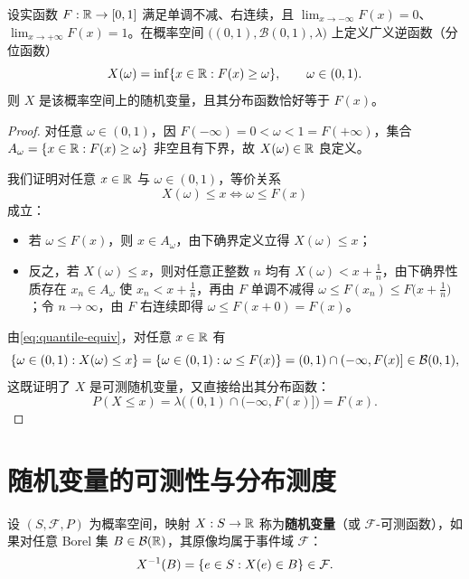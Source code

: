 \begin{theorem}
\label{thm:cdf-sufficiency}
设实函数 $F:\mathbb{R}\to[0,1]$ 满足单调不减、右连续，且 $\lim_{x\to-\infty}F(x)=0$、$\lim_{x\to+\infty}F(x)=1$。在概率空间 $\bigl((0,1),\mathcal{B}(0,1),\lambda\bigr)$ 上定义广义逆函数（分位函数）
\begin{equation}
  X(\omega)=\inf\{x\in\mathbb{R}: F(x)\ge\omega\},\qquad \omega\in(0,1).
  \label{eq:quantile-construction}
\end{equation}
则 $X$ 是该概率空间上的随机变量，且其分布函数恰好等于 $F(x)$。
\end{theorem}
\begin{proof}
对任意 $\omega\in(0,1)$，因 $F(-\infty)=0<\omega<1=F(+\infty)$，集合 $A_\omega=\{x\in\mathbb{R}: F(x)\ge\omega\}$ 非空且有下界，故 $X(\omega)\in\mathbb{R}$ 良定义。

我们证明对任意 $x\in\mathbb{R}$ 与 $\omega\in(0,1)$，等价关系
\begin{equation}
  X(\omega)\le x \iff \omega\le F(x)
  \label{eq:quantile-equiv}
\end{equation}
成立：
\begin{itemize}
  \item 若 $\omega\le F(x)$，则 $x\in A_\omega$，由下确界定义立得 $X(\omega)\le x$；
  \item 反之，若 $X(\omega)\le x$，则对任意正整数 $n$ 均有 $X(\omega)<x+\frac{1}{n}$，由下确界性质存在 $x_n\in A_\omega$ 使 $x_n<x+\frac{1}{n}$，再由 $F$ 单调不减得 $\omega\le F(x_n)\le F\bigl(x+\frac{1}{n}\bigr)$；令 $n\to\infty$，由 $F$ 右连续即得 $\omega\le F(x+0)=F(x)$。
\end{itemize}
由\eqref{eq:quantile-equiv}，对任意 $x\in\mathbb{R}$ 有
\[
  \{\omega\in(0,1): X(\omega)\le x\}=\{\omega\in(0,1): \omega\le F(x)\}=(0,1)\cap(-\infty,F(x)]\in\mathcal{B}(0,1),
\]
这既证明了 $X$ 是可测随机变量，又直接给出其分布函数：
\[
  P(X\le x)=\lambda\bigl((0,1)\cap(-\infty,F(x)]\bigr)=F(x).
\]
\end{proof}

\section{随机变量的可测性与分布测度}
\label{sec:app-measurability}

\begin{definition}[随机变量的严格定义]
\label{def:measurable-rv}
设 $(S,\mathcal{F},P)$ 为概率空间，映射 $X:S\to\mathbb{R}$ 称为\textbf{随机变量}（或 $\mathcal{F}$-可测函数），如果对任意 Borel 集 $B\in\mathcal{B}(\mathbb{R})$，其原像均属于事件域 $\mathcal{F}$：
\[
  X^{-1}(B)=\{e\in S: X(e)\in B\}\in\mathcal{F}.
\]
\end{definition}

